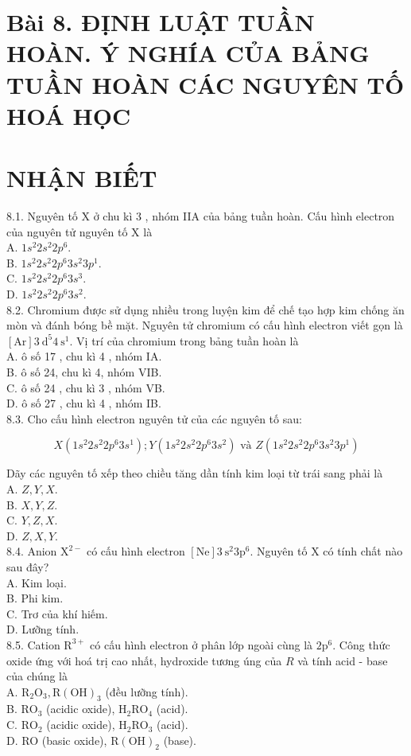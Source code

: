 \documentclass[10pt]{article}
\begin{document}
\section*{Bài 8. ĐỊNH LUẬT TUẦN HOÀN. Ý NGHÍA CỦA BẢNG TUẦN HOÀN CÁC NGUYÊN TỐ HOÁ HỌC}
\section*{NHẬN BIẾT}
8.1. Nguyên tố X ở chu kì 3 , nhóm IIA của bảng tuần hoàn. Cấu hình electron của nguyên tử nguyên tố X là\\
A. $1 s^{2} 2 s^{2} 2 p^{6}$.\\
B. $1 s^{2} 2 s^{2} 2 p^{6} 3 s^{2} 3 p^{1}$.\\
C. $1 s^{2} 2 s^{2} 2 p^{6} 3 s^{3}$.\\
D. $1 s^{2} 2 s^{2} 2 p^{6} 3 s^{2}$.\\
8.2. Chromium được sử dụng nhiều trong luyện kim để chế tạo hợp kim chống ăn mòn và đánh bóng bề mặt. Nguyên tử chromium có cấu hình electron viết gọn là $[\mathrm{Ar}] 3 \mathrm{~d}^{5} 4 \mathrm{~s}^{1}$. Vị trí của chromium trong bảng tuần hoàn là\\
A. ô số 17 , chu kì 4 , nhóm IA.\\
B. ô số 24, chu kì 4, nhóm VIB.\\
C. ô số 24 , chu kì 3 , nhóm VB.\\
D. ô số 27 , chu kì 4 , nhóm IB.\\
8.3. Cho cấu hình electron nguyên tử của các nguyên tố sau:

$$
X\left(1 s^{2} 2 s^{2} 2 p^{6} 3 s^{1}\right) ; Y\left(1 s^{2} 2 s^{2} 2 p^{6} 3 s^{2}\right) \text { và } Z\left(1 s^{2} 2 s^{2} 2 p^{6} 3 s^{2} 3 p^{1}\right)
$$

Dãy các nguyên tố xếp theo chiều tăng dần tính kim loại từ trái sang phải là\\
A. $Z, Y, X$.\\
B. $X, Y, Z$.\\
C. $Y, Z, X$.\\
D. $Z, X, Y$.\\
8.4. Anion $\mathrm{X}^{2-}$ có cấu hình electron $[\mathrm{Ne}] 3 \mathrm{~s}^{2} 3 \mathrm{p}^{6}$. Nguyên tố X có tính chất nào sau đây?\\
A. Kim loại.\\
B. Phi kim.\\
C. Trơ của khí hiếm.\\
D. Lưỡng tính.\\
8.5. Cation $\mathrm{R}^{3+}$ có cấu hình electron ở phân lớp ngoài cùng là $2 \mathrm{p}^{6}$. Công thức oxide ứng với hoá trị cao nhất, hydroxide tương úng của $R$ và tính acid - base của chúng là\\
A. $\mathrm{R}_{2} \mathrm{O}_{3}, \mathrm{R}(\mathrm{OH})_{3}$ (đều lưỡng tính).\\
B. $\mathrm{RO}_{3}$ (acidic oxide), $\mathrm{H}_{2} \mathrm{RO}_{4}$ (acid).\\
C. $\mathrm{RO}_{2}$ (acidic oxide), $\mathrm{H}_{2} \mathrm{RO}_{3}$ (acid).\\
D. RO (basic oxide), $\mathrm{R}(\mathrm{OH})_{2}$ (base).
\end{document}
